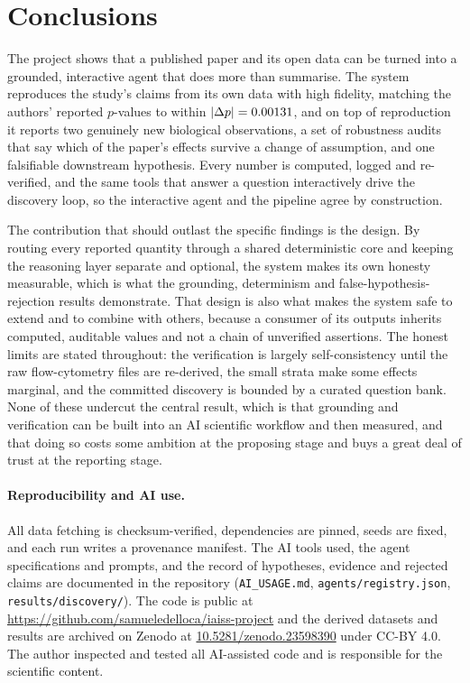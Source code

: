 \documentclass[11pt]{article}
\begin{document}
\section{Conclusions}
The project shows that a published paper and its open data can be turned into a grounded, interactive
agent that does more than summarise. The system reproduces the study's claims from its own data with
high fidelity, matching the authors' reported $p$-values to within $|\Delta p|=0.00131{}$,
and on top of reproduction it reports two genuinely new biological observations, a set of robustness
audits that say which of the paper's effects survive a change of assumption, and one falsifiable
downstream hypothesis. Every number is computed, logged and re-verified, and the same tools that
answer a question interactively drive the discovery loop, so the interactive agent and the pipeline
agree by construction.

The contribution that should outlast the specific findings is the design. By routing every reported
quantity through a shared deterministic core and keeping the reasoning layer separate and optional,
the system makes its own honesty measurable, which is what the grounding, determinism and
false-hypothesis-rejection results demonstrate. That design is also what makes the system safe to
extend and to combine with others, because a consumer of its outputs inherits computed, auditable
values and not a chain of unverified assertions. The honest limits are stated throughout: the
verification is largely self-consistency until the raw flow-cytometry files are re-derived, the small
strata make some effects marginal, and the committed discovery is bounded by a curated question bank.
None of these undercut the central result, which is that grounding and verification can be built into
an AI scientific workflow and then measured, and that doing so costs some ambition at the proposing
stage and buys a great deal of trust at the reporting stage.

\paragraph{Reproducibility and AI use.}
All data fetching is checksum-verified, dependencies are pinned, seeds are fixed, and each run
writes a provenance manifest. The AI tools used, the agent specifications and prompts, and the
record of hypotheses, evidence and rejected claims are documented in the repository
(\texttt{AI\_USAGE.md}, \texttt{agents/registry.json}, \texttt{results/discovery/}). The code is
public at \url{https://github.com/samueledelloca/iaiss-project} and the derived datasets and results
are archived on Zenodo at \href{https://doi.org/10.5281/zenodo.23598390}{10.5281/zenodo.23598390}
under CC-BY 4.0. The author
inspected and tested all AI-assisted code and is responsible for the scientific content.
\end{document}
